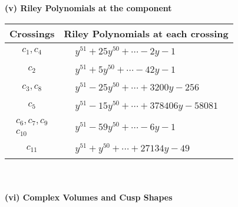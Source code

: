 \documentclass[1p]{elsarticle_modified}
\theoremstyle{definition}
\begin{document}
\newpage\renewcommand{\arraystretch}{1}
\flushleft \textbf{(v) Riley Polynomials at the component}\newline \\
\begin{tabular}{m{50pt}|m{274pt}}
Crossings & \hspace{64pt}Riley Polynomials at each crossing \\
\hline $$\begin{aligned}c_{1},c_{4}\end{aligned}$$&$\begin{aligned}
&y^{51}+25 y^{50}+\cdots-2 y-1
\end{aligned}$\\
\hline $$\begin{aligned}c_{2}\end{aligned}$$&$\begin{aligned}
&y^{51}+5 y^{50}+\cdots-42 y-1
\end{aligned}$\\
\hline $$\begin{aligned}c_{3},c_{8}\end{aligned}$$&$\begin{aligned}
&y^{51}-25 y^{50}+\cdots+3200 y-256
\end{aligned}$\\
\hline $$\begin{aligned}c_{5}\end{aligned}$$&$\begin{aligned}
&y^{51}-15 y^{50}+\cdots+378406 y-58081
\end{aligned}$\\
\hline $$\begin{aligned}c_{6},c_{7},c_{9}\\c_{10}\end{aligned}$$&$\begin{aligned}
&y^{51}-59 y^{50}+\cdots-6 y-1
\end{aligned}$\\
\hline $$\begin{aligned}c_{11}\end{aligned}$$&$\begin{aligned}
&y^{51}+y^{50}+\cdots+27134 y-49
\end{aligned}$\\
\hline
\end{tabular}\\~\\
\newpage\flushleft \textbf{(vi) Complex Volumes and Cusp Shapes}
\end{document}
